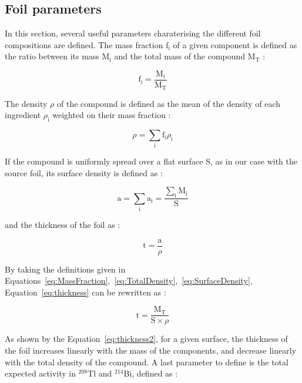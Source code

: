 \documentclass[main.tex]{subfiles}
\begin{document}
\subsection{Foil parameters}\label{sec:FoilParameters}


\NI In this section, several useful parameters charaterising the different foil compositions are defined. The mass fraction f$_\text{i}$ of a given component is defined as the ratio between its mass M$_\text{i}$ and the total mass of the compound M$_\text{T}$ :


\begin{equation}\label{eq:MassFraction}
\text{f}_\text{i} = \frac{\text{M}_\text{i}}{\text{M}_\text{T}}
\end{equation}


\NI The density $\rho$ of the compound is defined as the mean of the density of each ingredient $\rho_\text{i}$ weighted on their mass fraction :


\begin{equation}\label{eq:TotalDensity}
\rho = \sum_\text{i} \text{f}_\text{i} \rho_\text{i} 
\end{equation}


\NI If the compound is uniformly spread over a flat surface S, as in our case with the source foil, its surface density is defined as :


\begin{equation}\label{eq:SurfaceDensity}
\text{a} = \sum_\text{i} \text{a}_\text{i} = \frac{\sum_\text{i} \text{M}_\text{i}}{\text{S}}
\end{equation}

\NI and the thickness of the foil as :


\begin{equation}\label{eq:thickness}
\text{t} = \frac{\text{a}}{\rho}
\end{equation}


\NI By taking the definitions given in Equations~\ref{eq:MassFraction},~\ref{eq:TotalDensity},~\ref{eq:SurfaceDensity}, Equation~\ref{eq:thickness} can be rewritten as : 


\begin{equation}\label{eq:thickness2}
\text{t} = \frac{\text{M}_\text{T}}{\text{S} \times \rho}
\end{equation} 


\NI As shown by the Equation~\ref{eq:thickness2}, for a given surface, the thickness of the foil increases linearly with the mass of the components, and decrease linearly with the total density of the compound. A last parameter to define is the total expected activity in $^{\text{208}}$Tl and $^{\text{214}}$Bi, defined as : 
\end{document}
